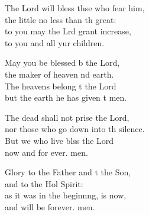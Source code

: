 \begin{psalmverse}
\begin{patverse}
The Lord will bless thse who fear him,\Med\\
the little no less than th great:\\
to you may the Lrd grant increase,\Med\\
to you and all yur children.

May you be blessed b the Lord,\Med\\
the maker of heaven nd earth.\\
The heavens belong t the Lord\Med\\
but the earth he has given t men.

The dead shall not prise the Lord,\Med\\
nor those who go down into th silence.\\
But we who live blss the Lord\Med\\
now and for ever. men.

Glory to the Father and t the Son,\Med\\
and to the Hol Spirit:\\
as it was in the beginn\pointup{\i}ng, is now,\Med\\
and will be forever. men. 
  \end{patverse}
\end{psalmverse}
